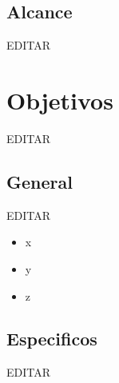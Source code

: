 \documentclass[preprint,12pt]{elsarticle}
\begin{document}

\subsection {\textbf{Alcance}}

EDITAR\\



\section{Objetivos}

EDITAR\\

\begin{figure}[htb]
	\begin{center}
	\end{center}
\end{figure}


\subsection{\textbf{General}}

EDITAR\\

\begin{itemize}

\item x
\item y
\item z

\end{itemize}


\subsection{\textbf{Especificos}}

EDITAR\\
\end{document}

